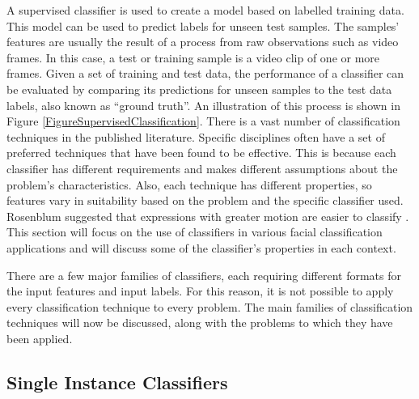A supervised classifier is used to create a model based on labelled training data. This model can be used to predict labels for unseen test samples. The samples' features are usually the result of a \featureGeneration process from raw observations such as video frames. In this case, a test or training sample is a video clip of one or more frames. Given a set of training and test data, the performance of a classifier can be evaluated by comparing its predictions for unseen samples to the test data labels, also known as ``ground truth''. An illustration of this process is shown in Figure \ref{FigureSupervisedClassification}. There is a vast number of classification techniques in the published literature. Specific disciplines often have a set of preferred techniques that have been found to be effective. This is because each classifier has different requirements and makes different assumptions about the problem's characteristics. Also, each \featureGeneration technique has different properties, so features vary in suitability based on the problem and the specific classifier used. Rosenblum suggested that expressions with greater motion are easier to classify \cite{Rosenblum1996}. This section will focus on the use of classifiers in various facial classification applications and will discuss some of the classifier's properties in each context.

There are a few major families of classifiers, each requiring different formats for the input features and input labels. 
For this reason, it is not possible to apply every classification technique to every problem. 
The main families of classification techniques will now be discussed, along with the problems to which they have been applied.

\subsection{Single Instance Classifiers}

